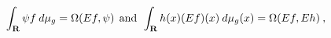 \begin{equation}\int_{\bf R} \psi f \:d\mu_g = \Omega(Ef,\psi) \:\:\mbox{and}\:\:
\int_{\bf R} h(x)(Ef)(x) \: d\mu_g(x) = \Omega(Ef,Eh)
\label{psif}\:, 
\end{equation}

